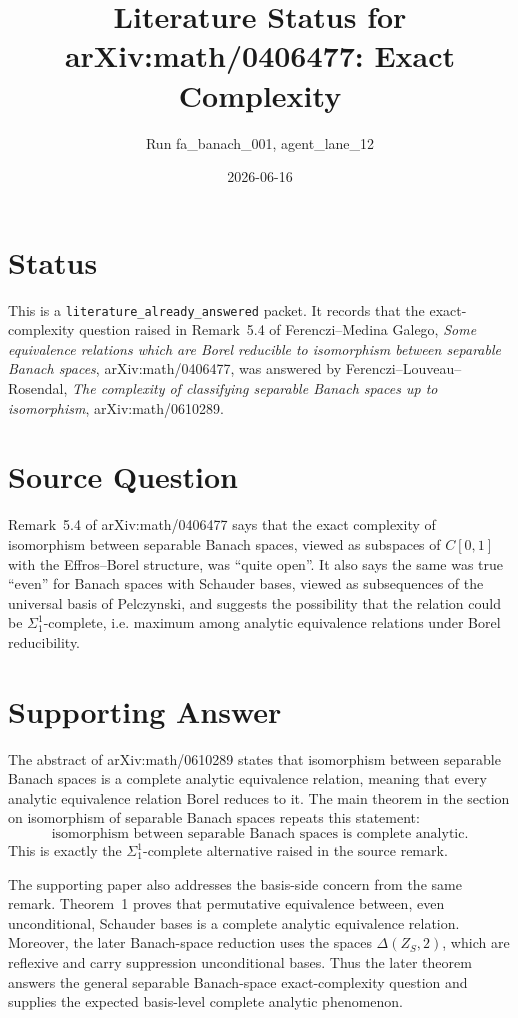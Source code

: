 \documentclass[11pt]{article}
\title{Literature Status for arXiv:math/0406477: Exact Complexity}
\author{Run fa\_banach\_001, agent\_lane\_12}
\date{2026-06-16}
\begin{document}
\maketitle

\section*{Status}

This is a \texttt{literature\_already\_answered} packet.  It records that the
exact-complexity question raised in Remark~5.4 of Ferenczi--Medina Galego,
\emph{Some equivalence relations which are Borel reducible to isomorphism
between separable Banach spaces}, arXiv:math/0406477, was answered by
Ferenczi--Louveau--Rosendal, \emph{The complexity of classifying separable
Banach spaces up to isomorphism}, arXiv:math/0610289.

\section*{Source Question}

Remark~5.4 of arXiv:math/0406477 says that the exact complexity of isomorphism
between separable Banach spaces, viewed as subspaces of \(C[0,1]\) with the
Effros--Borel structure, was ``quite open''.  It also says the same was true
``even'' for Banach spaces with Schauder bases, viewed as subsequences of the
universal basis of Pelczynski, and suggests the possibility that the relation
could be \(\Sigma^1_1\)-complete, i.e. maximum among analytic equivalence
relations under Borel reducibility.

\section*{Supporting Answer}

The abstract of arXiv:math/0610289 states that isomorphism between separable
Banach spaces is a complete analytic equivalence relation, meaning that every
analytic equivalence relation Borel reduces to it.  The main theorem in the
section on isomorphism of separable Banach spaces repeats this statement:
\[
\text{isomorphism between separable Banach spaces is complete analytic.}
\]
This is exactly the \(\Sigma^1_1\)-complete alternative raised in the source
remark.

The supporting paper also addresses the basis-side concern from the same
remark.  Theorem~1 proves that permutative equivalence between, even
unconditional, Schauder bases is a complete analytic equivalence relation.
Moreover, the later Banach-space reduction uses the spaces
\(\Delta(Z_S,2)\), which are reflexive and carry suppression unconditional
bases.  Thus the later theorem answers the general separable Banach-space
exact-complexity question and supplies the expected basis-level complete
analytic phenomenon.
\end{document}
